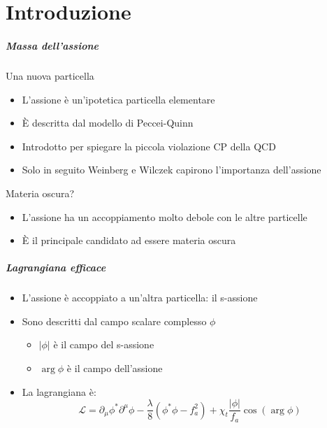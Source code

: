 \part{Introduzione}
\makepart

\begin{frame}
    \frametitle{Massa dell'assione}
    {\color{fzjblue} Una nuova particella}
    \begin{itemize}
        \item L'assione è un'ipotetica particella elementare
        \item È descritta dal modello di Peccei-Quinn
        \item Introdotto per spiegare la piccola violazione CP della QCD
        \item Solo in seguito Weinberg e Wilczek capirono l'importanza dell'assione
    \end{itemize}
    {\color{fzjblue} Materia oscura?}
    \begin{itemize}
        \item L'assione ha un accoppiamento molto debole con le altre particelle
        \item È il principale candidato ad essere materia oscura
    \end{itemize}
\end{frame}

\begin{frame}
    \frametitle{Lagrangiana efficace}
    \begin{itemize}
        \item L'assione è accoppiato a un'altra particella: il s-assione
        \item Sono descritti dal campo scalare complesso $\phi$
            \begin{itemize}
                \item $\left|\phi\right|$ è il campo del s-assione
                \item $\arg\phi$ è il campo dell'assione
            \end{itemize}
        \item La lagrangiana è:
        $$\mathcal{L} = \partial_\mu\phi^*\partial^\mu\phi%
                      - \frac{\lambda}{8}\left(\phi^*\phi-f_a^2\right)%
                      + \chi_t\frac{\left|\phi\right|}{f_a}\cos(\arg\phi)$$
    \end{itemize}
\end{frame}

